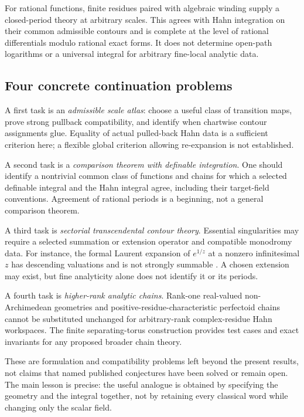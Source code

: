 \documentclass[11pt,letterpaper]{article}
\theoremstyle{definition}
\theoremstyle{remark}
\numberwithin{equation}{section}
\begin{document}
For rational functions, finite residues paired with algebraic winding supply a closed-period theory at arbitrary scales. This agrees with Hahn integration on their common admissible contours and is complete at the level of rational differentials modulo rational exact forms. It does not determine open-path logarithms or a universal integral for arbitrary fine-local analytic data.

\subsection{Four concrete continuation problems}
A first task is an \emph{admissible scale atlas}: choose a useful class of transition maps, prove strong pullback compatibility, and identify when chartwise contour assignments glue. Equality of actual pulled-back Hahn data is a sufficient criterion here; a flexible global criterion allowing re-expansion is not established.

A second task is a \emph{comparison theorem with definable integration}. One should identify a nontrivial common class of functions and chains for which a selected definable integral and the Hahn integral agree, including their target-field conventions. Agreement of rational periods is a beginning, not a general comparison theorem.

A third task is \emph{sectorial transcendental contour theory}. Essential singularities may require a selected summation or extension operator and compatible monodromy data. For instance, the formal Laurent expansion of $e^{1/z}$ at a nonzero infinitesimal $z$ has descending valuations and is not strongly summable \cite[\S13]{SA}. A chosen extension may exist, but fine analyticity alone does not identify it or its periods.

A fourth task is \emph{higher-rank analytic chains}. Rank-one real-valued non-Archimedean geometries and positive-residue-characteristic perfectoid chains cannot be substituted unchanged for arbitrary-rank complex-residue Hahn workspaces. The finite separating-torus construction provides test cases and exact invariants for any proposed broader chain theory.

These are formulation and compatibility problems left beyond the present results, not claims that named published conjectures have been solved or remain open. The main lesson is precise: the useful analogue is obtained by specifying the geometry and the integral together, not by retaining every classical word while changing only the scalar field.
\end{document}
